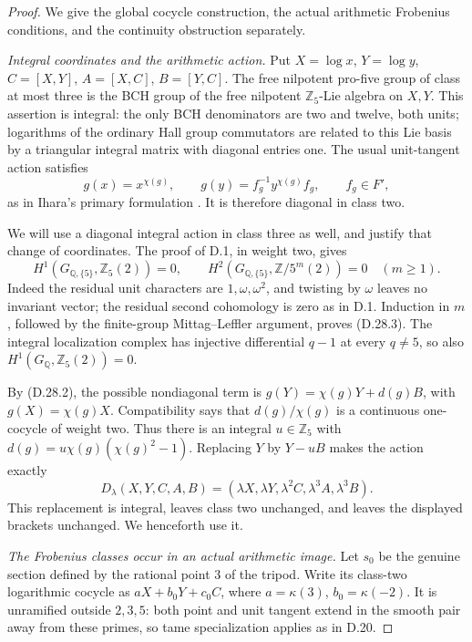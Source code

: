 \begin{proof}
We give the global cocycle construction,
the actual arithmetic Frobenius conditions,
and the continuity obstruction separately.

\emph{Integral coordinates and the arithmetic action.}
Put \(X=\log x\), \(Y=\log y\),
\(C=[X,Y]\), \(A=[X,C]\), \(B=[Y,C]\).
The free nilpotent pro-five group of class
at most three is the BCH group of the free
nilpotent \(\mathbb Z_5\)-Lie algebra on
\(X,Y\). This assertion is integral: the
only BCH denominators are two and twelve,
both units; logarithms of the ordinary Hall
group commutators are related to this Lie
basis by a triangular integral matrix with
diagonal entries one. The usual unit-tangent
action satisfies
\[
  g(x)=x^{\chi(g)},\qquad
  g(y)=f_g^{-1}y^{\chi(g)}f_g,\qquad f_g\in F',
                                                               \tag{D.28.2}
\]
as in Ihara's primary formulation
\cite[\S1, first paragraph]{DE_Ihara2000}.
It is therefore diagonal in class two.

We will use a diagonal integral action in
class three as well, and justify that
change of coordinates. The proof of D.1,
in weight two, gives
\[
 H^1(G_{\mathbb Q,\{5\}},\mathbb Z_5(2))=0,
 \qquad
 H^2(G_{\mathbb Q,\{5\}},\mathbb Z/5^m(2))=0
 \quad(m\ge1).                                 \tag{D.28.3}
\]
Indeed the residual unit characters are
\(1,\omega,\omega^2\), and twisting by
\(\omega\) leaves no invariant vector;
the residual second cohomology is zero
as in D.1. Induction in \(m\), followed
by the finite-group Mittag--Leffler argument,
proves (D.28.3). The integral localization
complex has injective differential
\(q-1\) at every \(q\ne5\), so also
\(H^1(G_{\mathbb Q},\mathbb Z_5(2))=0\).

By (D.28.2), the possible nondiagonal
term is
\(g(Y)=\chi(g)Y+d(g)B\), with
\(g(X)=\chi(g)X\). Compatibility says
that \(d(g)/\chi(g)\) is a continuous
one-cocycle of weight two. Thus there is
an integral \(u\in\mathbb Z_5\) with
\(d(g)=u\chi(g)(\chi(g)^2-1)\).
Replacing \(Y\) by \(Y-uB\) makes the
action exactly
\[
       D_\lambda(X,Y,C,A,B)
       =(\lambda X,\lambda Y,\lambda^2 C,
                       \lambda^3 A,\lambda^3 B).
                                                               \tag{D.28.4}
\]
This replacement is integral, leaves class
two unchanged, and leaves the displayed
brackets unchanged. We henceforth use it.

\emph{The Frobenius classes occur in an actual arithmetic image.}
Let \(s_0\) be the genuine section defined
by the rational point \(3\) of the tripod.
Write its class-two logarithmic cocycle as
\(aX+b_0Y+c_0C\), where
\(a=\kappa(3)\), \(b_0=\kappa(-2)\).
It is unramified outside \(2,3,5\):
both point and unit tangent extend in the
smooth pair away from these primes, so
tame specialization applies as in D.20.


\end{proof}
